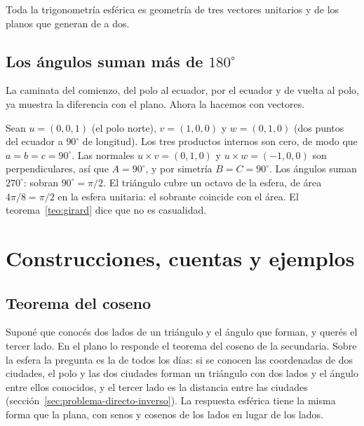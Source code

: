 \begin{idea}
Toda la trigonometría esférica es geometría de tres vectores unitarios y de los planos que
generan de a dos.
\end{idea}

\subsection{Los ángulos suman más de \texorpdfstring{\(180^\circ\)}{180°}}

La caminata del comienzo, del polo al ecuador, por el ecuador y de vuelta al polo, ya muestra
la diferencia con el plano. Ahora la hacemos con vectores.

\begin{ejemplo}[El octante]\label{ej:esfera-octante}
Sean \(u=(0,0,1)\) (el polo norte), \(v=(1,0,0)\) y \(w=(0,1,0)\) (dos puntos del ecuador a
\(90^\circ\) de longitud). Los tres productos internos son cero, de modo que
\(a=b=c=90^\circ\). Las normales \(u\times v=(0,1,0)\) y \(u\times w=(-1,0,0)\) son
perpendiculares, así que \(A=90^\circ\), y por simetría \(B=C=90^\circ\). Los ángulos suman
\(270^\circ\): sobran \(90^\circ=\pi/2\). El triángulo cubre un octavo de la esfera, de área
\(4\pi/8=\pi/2\) en la esfera unitaria: el sobrante coincide con el área. El
teorema~\ref{teo:girard} dice que no es casualidad.
\end{ejemplo}

\section{Construcciones, cuentas y ejemplos}

\subsection{Teorema del coseno}

Suponé que conocés dos lados de un triángulo y el ángulo que forman, y querés el tercer lado.
En el plano lo responde el teorema del coseno de la secundaria. Sobre la esfera la pregunta
es la de todos los días: si se conocen las coordenadas de dos ciudades, el polo y las dos
ciudades forman un triángulo con dos lados y el ángulo entre ellos conocidos, y el tercer lado
es la distancia entre las ciudades (sección~\ref{sec:problema-directo-inverso}). La respuesta
esférica tiene la misma forma que la plana, con senos y cosenos de los lados en lugar de los
lados.

